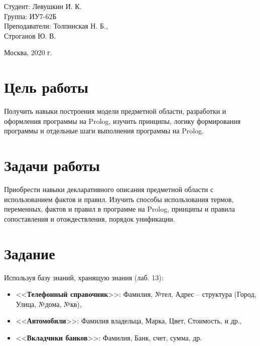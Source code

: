 \documentclass[a4paper,12pt]{article}
\begin{document}
	\vspace*{15mm} 	
	
	\large
	\begin{flushright}
		Студент: Левушкин И. К. \\
		Группа: ИУ7-62Б \\
		Преподаватели: Толпинская Н. Б., \\ Строганов Ю. В. \\
	\end{flushright}
	
	\vspace*{30mm}
	\begin{center}
		Москва, 2020 г.  
	\end{center}
	\thispagestyle{empty}
	
	
	\newpage
	
	\section*{Цель работы}
	
	 Получить навыки построения модели предметной области, разработки и оформления программы на Prolog, изучить принципы, логику формирования программы и отдельные шаги выполнения программы на Prolog.
	
	\section*{Задачи работы}
	
	Приобрести навыки декларативного описания предметной области с использованием фактов и правил.
	Изучить способы использования термов, переменных, фактов и правил в программе на Prolog, принципы  и правила сопоставления и отождествления, порядок унификации.
	
	
	\section*{Задание}
	
	Используя  базу знаний, хранящую знания (лаб. 13):
	\begin{itemize}
		\item <<{\bf Телефонный справочник}>>: Фамилия, №тел, Адрес – структура (Город, Улица, №дома, №кв),
		\item <<{\bf Автомобили}>>: Фамилия владельца, Марка, Цвет, Стоимость, и др.,
		\item <<{\bf Вкладчики банков}>>: Фамилия, Банк, счет, сумма, др.
	\end{itemize}
\end{document}
